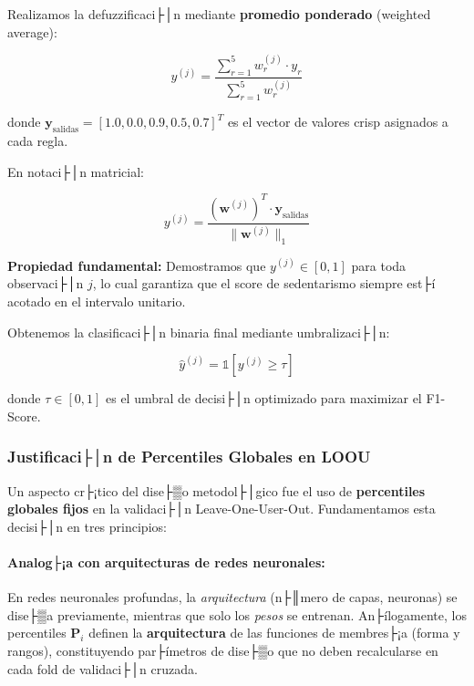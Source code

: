 Realizamos la defuzzificaci├│n mediante \textbf{promedio ponderado} (weighted average):

\begin{equation}
y^{(j)} = \frac{\sum_{r=1}^{5} w_r^{(j)} \cdot y_r}{\sum_{r=1}^{5} w_r^{(j)}}
\label{eq:defuzzificacion}
\end{equation}

donde \(\mathbf{y}_{\text{salidas}} = [1.0, 0.0, 0.9, 0.5, 0.7]^T\) es el vector de valores crisp asignados a cada regla.

En notaci├│n matricial:

\begin{equation}
y^{(j)} = \frac{(\mathbf{w}^{(j)})^T \cdot \mathbf{y}_{\text{salidas}}}{\|\mathbf{w}^{(j)}\|_1}
\label{eq:defuzz_matricial}
\end{equation}

\textbf{Propiedad fundamental:} Demostramos que \(y^{(j)} \in [0, 1]\) para toda observaci├│n \(j\), lo cual garantiza que el score de sedentarismo siempre est├í acotado en el intervalo unitario.

Obtenemos la clasificaci├│n binaria final mediante umbralizaci├│n:

\begin{equation}
\hat{y}^{(j)} = \mathbb{1}[y^{(j)} \geq \tau]
\label{eq:binarizacion}
\end{equation}

donde \(\tau \in [0, 1]\) es el umbral de decisi├│n optimizado para maximizar el F1-Score.

\subsubsection{Justificaci├│n de Percentiles Globales en LOOU}
\label{subsubsec:percentiles_globales}

Un aspecto cr├¡tico del dise├▒o metodol├│gico fue el uso de \textbf{percentiles globales fijos} en la validaci├│n Leave-One-User-Out. Fundamentamos esta decisi├│n en tres principios:

\paragraph{Analog├¡a con arquitecturas de redes neuronales:}
En redes neuronales profundas, la \textit{arquitectura} (n├║mero de capas, neuronas) se dise├▒a previamente, mientras que solo los \textit{pesos} se entrenan. An├ílogamente, los percentiles \(\mathbf{P}_i\) definen la \textbf{arquitectura} de las funciones de membres├¡a (forma y rangos), constituyendo par├ímetros de dise├▒o que no deben recalcularse en cada fold de validaci├│n cruzada.

